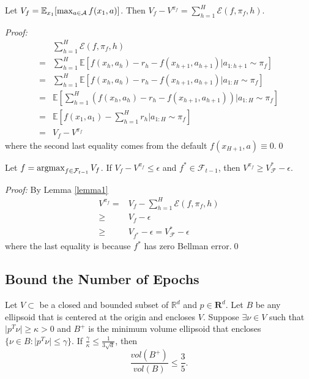 \documentclass[11pt]{article}
\begin{document}
\begin{lemma}\label{lemma1}
Let $V_f=\mathbb E_{x_1} [\max_{a\in\mathcal{A}}f(x_1,a)]$. Then $V_f-V^{\pi_f}=\sum_{h=1}^H\mathcal E(f,\pi_f,h)$.
\end{lemma}
\textit{Proof: }
\begin{align*}
&\sum_{h=1}^H\mathcal E(f,\pi_f,h)\\
=&\sum_{h=1}^H\mathbb E[f(x_h,a_h)-r_h-f(x_{h+1},a_{h+1})\vert a_{1:h+1}\sim \pi_f]\\
=&\sum_{h=1}^H\mathbb E[f(x_h,a_h)-r_h-f(x_{h+1},a_{h+1})\vert a_{1:H}\sim \pi_f]\\
=&\mathbb E[\sum_{h=1}^H(f(x_h,a_h)-r_h-f(x_{h+1},a_{h+1}))\vert a_{1:H}\sim \pi_f]\\
=&\mathbb E[f(x_1,a_1)-\sum_{h=1}^Hr_h\vert a_{1:H}\sim \pi_f]\\
=&V_f-V^{\pi_f}
\end{align*}
where the second last equality comes from the default $f(x_{H+1},a)\equiv 0$.\qed

\begin{proposition}
Let $f=\operatorname*{argmax}_{f\in\mathcal F_{t-1}}V_f$. If $V_{f}-V^{\pi_{f}}\leq \epsilon$ and $f^*\in \mathcal F_{t-1}$, then $V^{\pi_f}\geq V_{\mathcal F}^*-\epsilon$.
\end{proposition}
\textit{Proof: }By Lemma \ref{lemma1}
\begin{align*}
V^{\pi_f}=&V_{f}-\sum_{h=1}^H\mathcal E(f,\pi_f,h)\\
\geq&V_{f}-\epsilon\\
\geq&V_{f^*}-\epsilon=V_{\mathcal F}^*-\epsilon
\end{align*}
where the last equality is because $f^*$ has zero Bellman error.\qed

\subsection{Bound the Number of Epochs}
\begin{lemma}\label{ellipsoid}
Let $V\subset $ be a closed and bounded subset of $\mathbb R^d$ and $p\in \mathbf R^d$. Let $B$ be any ellipsoid that is centered at the origin and encloses $V$. Suppose $\exists \nu\in V$ such that $\vert p^T\nu\vert \geq\kappa>0$ and $B^+$ is the minimum volume ellipsoid that encloses $\{\nu\in B:\vert p^T\nu \vert\leq \gamma\}$. If $\frac{\gamma}{\kappa}\leq \frac{1}{3\sqrt{d}}$, then
\begin{equation*}
\frac{vol(B^+)}{vol(B)}\leq \frac{3}{5}.
\end{equation*}

\end{lemma}
\end{document}
